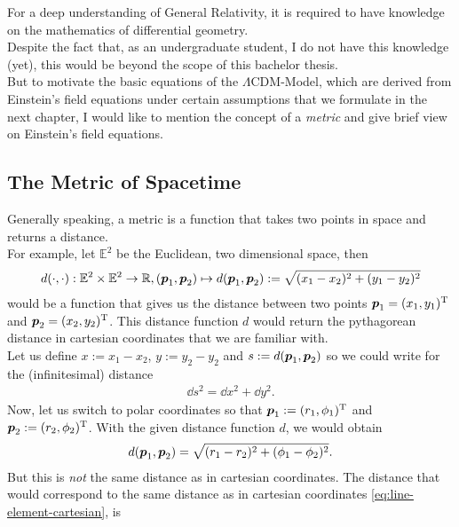 \noindent For a deep understanding of General Relativity, it is required to have knowledge on the mathematics of differential geometry. \\
\noindent Despite the fact that, as an undergraduate student, I do not have this knowledge (yet), this would be beyond the scope of this bachelor thesis. \\
\noindent But to motivate the basic equations of the $\Lambda$CDM-Model, which are derived from Einstein's field equations under certain assumptions that we formulate in the next chapter, I would like to mention the concept of a \textit{metric} and give brief view on Einstein's field equations.

\subsection{The Metric of Spacetime}
Generally speaking, a metric is a function that takes two points in space and returns a distance. \\
For example, let $\mathbb{E}^2$ be the Euclidean, two dimensional space, then
\begin{align}
    d(\cdot, \cdot) : \mathbb{E}^{2} \times \mathbb{E}^{2} \to \mathbb{R}, (\vb*{p}_{1}, \vb*{p}_{2}) \mapsto d(\vb*{p}_{1}, \vb*{p}_{2}) := \sqrt{(x_{1} - x_{2})^2 + (y_{1} - y_{2})^2} 
\end{align}
would be a function that gives us the distance between two points $\vb*{p}_{1} = (x_{1}, y_{1})^{\text{T}}$ and $\vb*{p}_{2} = (x_{2}, y_{2})^{\text{T}}$. This distance function $d$ would return the pythagorean distance in cartesian coordinates that we are familiar with. \\
Let us define $x := x_{1} - x_{2}$, $y := y_{2} - y_{2}$ and $s := d(\vb*{p}_{1}, \vb*{p}_{2})$ so we could write for the (infinitesimal) distance 
\begin{align}
    \dd{s}^2 = \dd{x}^2 + \dd{y}^2. \label{eq:line-element-cartesian}
\end{align}
Now, let us switch to polar coordinates so that $\vb*{p}_{1} := (r_{1}, \phi_{1})^{\text{T}}$ and $\vb*{p}_{2} := (r_{2}, \phi_{2})^{\text{T}}$. With the given distance function $d$, we would obtain 
\begin{align}
    d(\vb*{p}_{1}, \vb*{p}_{2}) = \sqrt{(r_{1} - r_{2})^2 + (\phi_{1} - \phi_{2})^2}. 
\end{align}
But this is \textit{not} the same distance as in cartesian coordinates. The distance that would correspond to the same distance as in cartesian coordinates \eqref{eq:line-element-cartesian}, is
